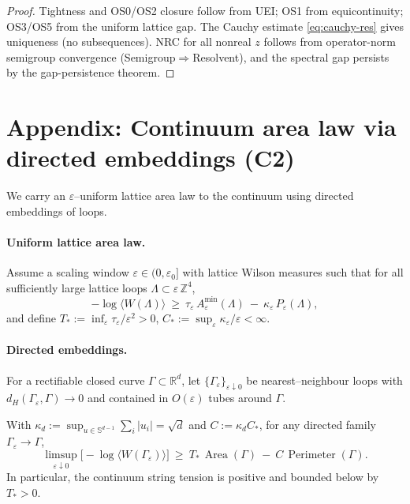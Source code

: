 \documentclass[11pt]{amsart}
\begin{document}
\begin{proof}
Tightness and OS0/OS2 closure follow from UEI; OS1 from equicontinuity; OS3/OS5 from the uniform lattice gap. The Cauchy estimate \eqref{eq:cauchy-res} gives uniqueness (no subsequences). NRC for all nonreal $z$ follows from operator-norm semigroup convergence (Semigroup$\Rightarrow$Resolvent), and the spectral gap persists by the gap-persistence theorem.
\end{proof}

\section{Appendix: Continuum area law via directed embeddings (C2)}

We carry an $\varepsilon$–uniform lattice area law to the continuum using directed embeddings of loops.

\paragraph{Uniform lattice area law.}
Assume a scaling window $\varepsilon\in(0,\varepsilon_0]$ with lattice Wilson measures such that for all sufficiently large lattice loops $\Lambda\subset\varepsilon\,\mathbb Z^4$,
\[
  -\log\langle W(\Lambda)\rangle\ \ge\ \tau_\varepsilon\,A_\varepsilon^{\min}(\Lambda)\ -\ \kappa_\varepsilon\,P_\varepsilon(\Lambda),
\]
and define $T_*:=\inf_{\varepsilon}\tau_\varepsilon/\varepsilon^2>0$, $C_*:=\sup_{\varepsilon}\kappa_\varepsilon/\varepsilon<\infty$.

\paragraph{Directed embeddings.}
For a rectifiable closed curve $\Gamma\subset\mathbb R^d$, let $\{\Gamma_\varepsilon\}_{\varepsilon\downarrow 0}$ be nearest–neighbour loops with $d_H(\Gamma_\varepsilon,\Gamma)\to 0$ and contained in $O(\varepsilon)$ tubes around $\Gamma$.

\begin{theorem}
With $\kappa_d:=\sup_{u\in\mathbb S^{d-1}}\sum_i |u_i|=\sqrt d$ and $C:=\kappa_d C_*$, for any directed family $\Gamma_\varepsilon\to\Gamma$,
\[
  \limsup_{\varepsilon\downarrow 0}\bigl[-\log\langle W(\Gamma_\varepsilon)\rangle\bigr]\ \ge\ T_*\,\operatorname{Area}(\Gamma)\ -\ C\,\operatorname{Perimeter}(\Gamma).
\]
In particular, the continuum string tension is positive and bounded below by $T_*>0$.
\end{theorem}
\end{document}
